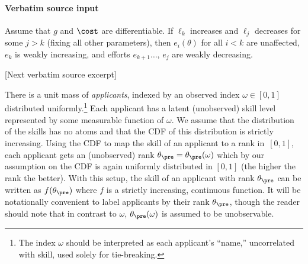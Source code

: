 \documentclass[10pt]{article}
\begin{document}
\paragraph{Verbatim source input}
\begin{ReviewVerbatim}
\begin{corollary}
	\label{corr:effectcomparativestatics}
	{Assume that $g$ and $\cost$ are differentiable.}
	{If} $\ell_k$ increases {and $\ell_j$ decreases for some $j>k$} (fixing all other parameters), then {$e_{i}(\theta)$ for all $i < k$ are unaffected,
		$e_k$ is weakly increasing, and efforts $e_{k+1}\dots$, $e_j$ are weakly decreasing.}
\end{corollary}

[Next verbatim source excerpt]

There is a unit mass of \textit{applicants}, indexed by an observed index $\omega \in [0,1]$ distributed uniformly.\footnote{The index $\omega$ should be interpreted as each applicant's ``name,'' uncorrelated with skill, used solely for tie-breaking.}  Each applicant has a latent (unobserved) skill level represented by some measurable function of $\omega$.
We assume that {the distribution of the skills} has no atoms and that the CDF of this distribution is strictly increasing.
Using the CDF to map the skill of an applicant to a rank in~$[0,1]$, each applicant gets an (unobserved) rank $\theta_\pre =\theta_\pre(\omega)$ which by our assumption on the CDF is again uniformly distributed in $[0, 1]$ (the higher the rank the better).  With this setup, the skill of an applicant with rank $\theta_\pre$ can be written as $f(\theta_\pre)$ where $f$ is a strictly increasing, continuous function.  {It will be notationally convenient to label applicants by their rank $\theta_\pre$, though the reader should note that in contrast to $\omega$, $\theta_\pre(\omega)$ is assumed to be unobservable.}




\end{ReviewVerbatim}
\end{document}
